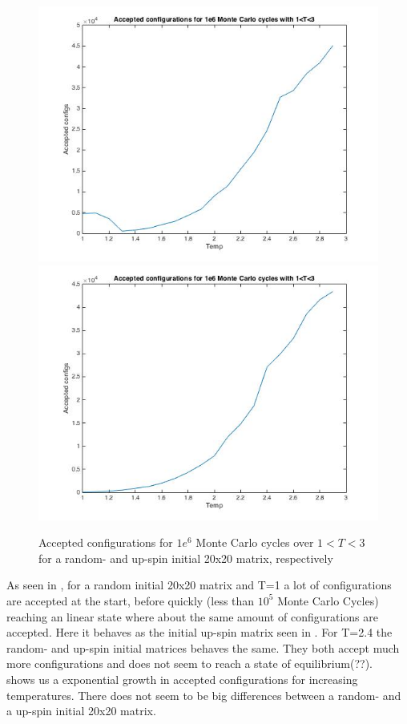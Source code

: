 \documentclass[10pt,a4paper]{article}
\begin{document}
\begin{figure}[H]
\centerline{
\includegraphics[scale=0.4]{acc20_1T3_1e6_ran}
\includegraphics[scale=0.4]{acc20_1T3_1e6_up}
}
\caption{Accepted configurations for $1e^6$ Monte Carlo cycles over $1<T<3$ for a random- and up-spin initial 20x20 matrix, respectively}
\label{fig:configs_T}
\end{figure}

\noindent As seen in , for a random initial 20x20 matrix and T=1 a lot of configurations are accepted at the start, before quickly (less than $10^5$ Monte Carlo Cycles) reaching an linear state where about the same amount of configurations are accepted. Here it behaves as the initial up-spin matrix seen in . For T=2.4 the random- and up-spin initial matrices behaves the same. They both accept much more configurations and does not seem to reach a state of equilibrium(??).\\
 shows us a exponential growth in accepted configurations for increasing temperatures. There does not seem to be big differences between a random- and a up-spin initial 20x20 matrix.
\end{document}
